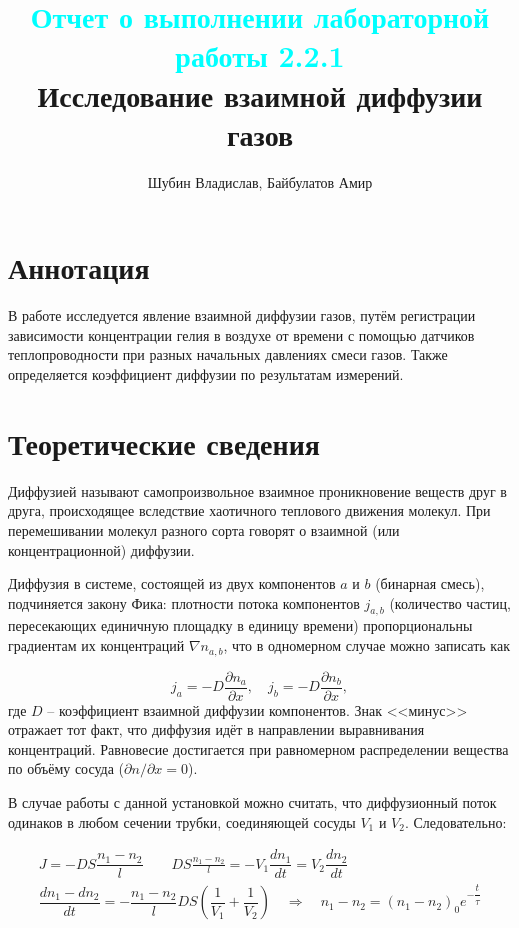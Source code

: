 \documentclass[
a4paper, %
12pt, %
]{article}
\title{
	\textcolor{cyan}{Отчет о выполнении лабораторной работы 2.2.1}
	\\
	Исследование взаимной диффузии газов
}
\author{Шубин Владислав, Байбулатов Амир}
\begin{document}
    
	
	\maketitle
	
	\section{Аннотация}
	В работе исследуется явление взаимной диффузии газов, путём регистрации зависимости концентрации гелия в воздухе от времени с помощью датчиков теплопроводности при разных начальных давлениях смеси газов. Также определяется коэффициент диффузии по результатам измерений.
	
	\newpage
	
	\section{Теоретические сведения}
	
	Диффузией называют самопроизвольное взаимное проникновение веществ друг в друга, происходящее вследствие хаотичного теплового движения молекул. При перемешивании молекул разного сорта говорят о взаимной (или концентрационной) диффузии.
	
	Диффузия в системе, состоящей из двух компонентов $ a $ и $ b $ (бинарная смесь), подчиняется закону Фика: плотности потока компонентов $ j_{a,b} $ (количество частиц, пересекающих единичную площадку в единицу времени) пропорциональны градиентам их концентраций $ \nabla n_{a,b}$, что в одномерном случае можно записать как
	
	\[ j_a = -D\dfrac{\partial n_a}{\partial x}, \quad j_b = -D\dfrac{\partial n_b}{\partial x}, \]
	где $ D $ -- коэффициент взаимной диффузии компонентов. Знак <<минус>> отражает тот факт, что диффузия идёт в направлении выравнивания концентраций. Равновесие достигается при равномерном распределении вещества по объёму сосуда ($ \partial n / \partial x = 0 $).
	
	В случае работы с данной установкой можно считать, что диффузионный поток одинаков в любом сечении трубки, соединяющей сосуды $V_1$ и $V_2$. Следовательно:
	
	\begin{align}
		J = -DS\dfrac{n_1-n_2}{l} \qquad DS\frac{n_1-n_2}{l} = -V_1\dfrac{dn_1}{dt} = V_2\dfrac{dn_2}{dt} \\
		\dfrac{dn_1 - dn_2}{dt} = -\dfrac{n_1-n_2}{l}DS\left(\dfrac{1}{V_1}+\dfrac{1}{V_2}\right) \quad\Rightarrow\quad n_1-n_2 = (n_1-n_2)_0e^{-\dfrac{t}{\tau}}
	\end{align}
	
\end{document}
